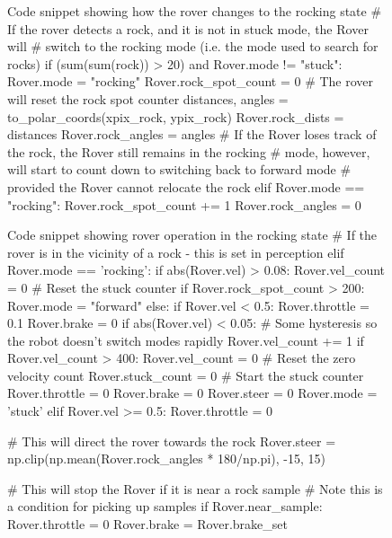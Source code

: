 \documentclass[a4paper]{article}
\begin{document}
\begin{figure}[h]\scriptsize
\begin{sexylisting}{Code snippet showing how the rover changes to the rocking state}
# If the rover detects a rock, and it is not in stuck mode, the Rover will
# switch to the rocking mode (i.e. the mode used to search for rocks)
if (sum(sum(rock)) > 20) and Rover.mode != "stuck":
	Rover.mode = "rocking"
	Rover.rock_spot_count = 0 # The rover will reset the rock spot counter
	distances, angles = to_polar_coords(xpix_rock, ypix_rock)
	Rover.rock_dists = distances
	Rover.rock_angles = angles
# If the Rover loses track of the rock, the Rover still remains in the rocking
# mode, however, will start to count down to switching back to forward mode
# provided the Rover cannot relocate the rock
elif Rover.mode == "rocking":
	Rover.rock_spot_count += 1
	Rover.rock_angles = 0
\end{sexylisting}
\end{figure}

\begin{figure}[h]\scriptsize
\begin{sexylisting}{Code snippet showing rover operation in the rocking state}
# If the rover is in the vicinity of a rock - this is set in perception 
        elif Rover.mode == 'rocking':
            if abs(Rover.vel) > 0.08:
                Rover.vel_count = 0 # Reset the stuck counter
            if Rover.rock_spot_count > 200:
                Rover.mode = "forward"
            else:
                if Rover.vel < 0.5:
                    Rover.throttle = 0.1
                    Rover.brake = 0
                    if abs(Rover.vel) < 0.05:
                        # Some hysteresis so the robot doesn't switch modes rapidly
                        Rover.vel_count += 1
                        if Rover.vel_count > 400:
                            Rover.vel_count = 0 # Reset the zero velocity count
                            Rover.stuck_count = 0 # Start the stuck counter
                            Rover.throttle = 0
                            Rover.brake = 0
                            Rover.steer = 0
                            Rover.mode = 'stuck'
                elif Rover.vel >= 0.5:
                    Rover.throttle = 0
                
                # This will direct the rover towards the rock
                Rover.steer = np.clip(np.mean(Rover.rock_angles * 180/np.pi), -15, 15)
                
                # This will stop the Rover if it is near a rock sample
                # Note this is a condition for picking up samples
                if Rover.near_sample:
                    Rover.throttle = 0
                    Rover.brake = Rover.brake_set
\end{sexylisting}
\end{figure}
\end{document}
